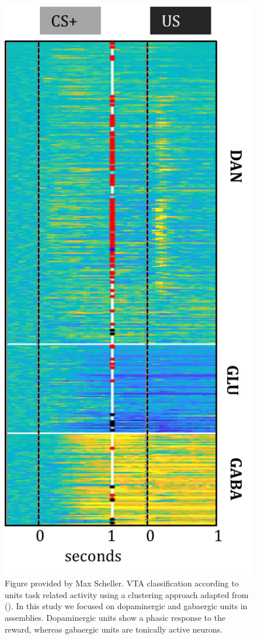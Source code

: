 \begin{figure}
  \centering
    \includegraphics[scale=0.75]{figures/ClassificationUnits.png}
   \caption{Figure provided by Max Scheller. VTA classification according to units task related activity using a clustering approach adapted from (\cite{Uchida}). In this study we focused on dopaminergic and gabaergic units in assemblies. Dopaminergic units show a phasic response to the reward, whereas gabaergic units are tonically active neurons.}
    \label{fig:ClassificatonVTA}
\end{figure}
